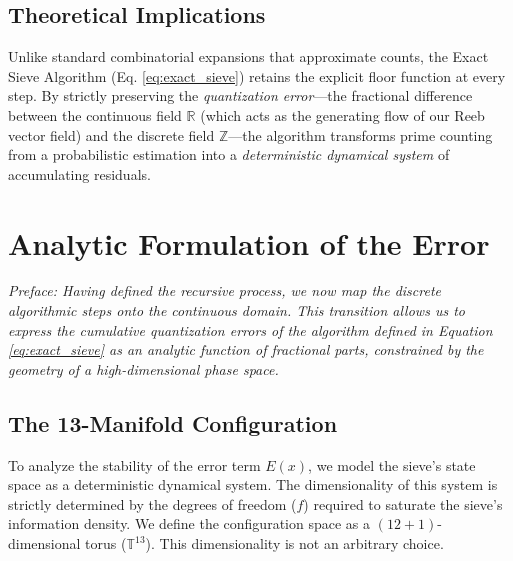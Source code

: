 \documentclass[sn-mathphys-num, pdflatex]{sn-jnl}
\begin{document}
\subsection{Theoretical Implications}
Unlike standard combinatorial expansions that approximate counts, the Exact Sieve Algorithm (Eq. \ref{eq:exact_sieve}) retains the explicit floor function at every step. By strictly preserving the \textit{quantization error}---the fractional difference between the continuous field $\mathbb{R}$ (which acts as the generating flow of our Reeb vector field) and the discrete field $\mathbb{Z}$---the algorithm transforms prime counting from a probabilistic estimation into a \textit{deterministic dynamical system} of accumulating residuals.
\section{Analytic Formulation of the Error}
\label{sec:analysis}

\textit{Preface: Having defined the recursive process, we now map the discrete algorithmic steps onto the continuous domain. This transition allows us to express the cumulative quantization errors of the algorithm defined in Equation \ref{eq:exact_sieve} as an analytic function of fractional parts, constrained by the geometry of a high-dimensional phase space.}

\subsection{The 13-Manifold Configuration}
\label{sec:13manifold}
To analyze the stability of the error term $E(x)$, we model the sieve's state space as a deterministic dynamical system. The dimensionality of this system is strictly determined by the degrees of freedom ($f$) required to saturate the sieve's information density. We define the configuration space as a $(12+1)$-dimensional torus ($\mathbb{T}^{13}$). This dimensionality is not an arbitrary choice.
\end{document}
